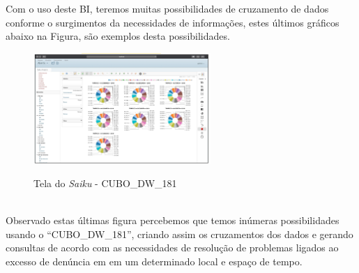 Com o uso deste BI, teremos muitas possibilidades de cruzamento de dados conforme o surgimentos da necessidades de informa\c{c}\~{o}es, estes últimos gr\'{a}ficos abaixo na Figura, s\~{a}o exemplos desta possibilidades.

\begin{figure}[H]
	\vspace*{0,2cm}
    \centering
    \caption{Tela do \textit{Saiku} - CUBO\_DW\_181}
    \includegraphics[width=0.6\textwidth]{./04-figuras/figura-saiku-pizza}
    \label{fig:ilustfigspizza}
\end{figure}
\vspace*{-0,9cm}
{\raggedright {}} \\

Observado estas últimas figura percebemos que temos inúmeras possibilidades usando o ``CUBO\_DW\_181'',  criando assim os cruzamentos dos dados e gerando consultas de acordo com as necessidades de resolu\c{c}\~{a}o de problemas ligados ao excesso de denúncia em em um determinado local e espa\c{c}o de tempo.
